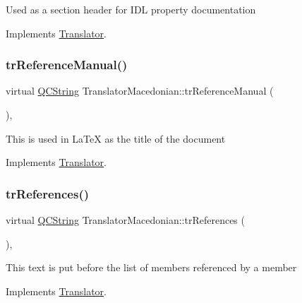 Used as a section header for I\+DL property documentation 

Implements \mbox{\hyperlink{class_translator}{Translator}}.

\mbox{\label{class_translator_macedonian_a59625513fd135176723d1eb272bdcbf8}} 
\subsubsection{\texorpdfstring{trReferenceManual()}{trReferenceManual()}}
{\footnotesize\ttfamily virtual \mbox{\hyperlink{class_q_c_string}{Q\+C\+String}} Translator\+Macedonian\+::tr\+Reference\+Manual (\begin{DoxyParamCaption}{ }\end{DoxyParamCaption})\hspace{0.3cm}{\ttfamily [inline]}, {\ttfamily [virtual]}}

This is used in La\+TeX as the title of the document 

Implements \mbox{\hyperlink{class_translator}{Translator}}.

\mbox{\label{class_translator_macedonian_a0e12497278feca4b1920181ae09ce3e1}} 
\subsubsection{\texorpdfstring{trReferences()}{trReferences()}}
{\footnotesize\ttfamily virtual \mbox{\hyperlink{class_q_c_string}{Q\+C\+String}} Translator\+Macedonian\+::tr\+References (\begin{DoxyParamCaption}{ }\end{DoxyParamCaption})\hspace{0.3cm}{\ttfamily [inline]}, {\ttfamily [virtual]}}

This text is put before the list of members referenced by a member 

Implements \mbox{\hyperlink{class_translator}{Translator}}.

\mbox{\label{class_translator_macedonian_a76342ac9edbf751481a6c9813e3c018a}} 
